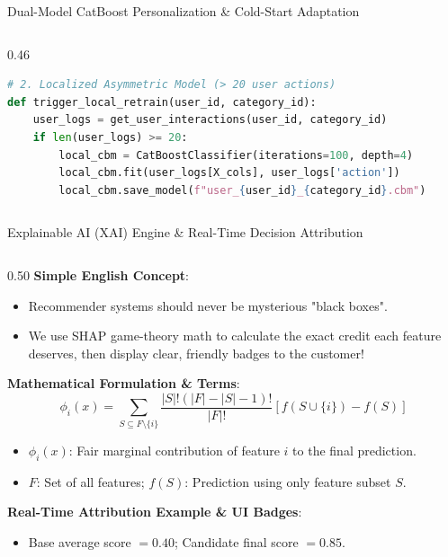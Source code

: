 \documentclass[10pt]{beamer}
\begin{document}
\begin{frame}[fragile]{Dual-Model CatBoost Personalization \& Cold-Start Adaptation}
\begin{columns}[T]
\begin{column}{0.46\textwidth}
\begin{lstlisting}[language=Python]
# 2. Localized Asymmetric Model (> 20 user actions)
def trigger_local_retrain(user_id, category_id):
    user_logs = get_user_interactions(user_id, category_id)
    if len(user_logs) >= 20:
        local_cbm = CatBoostClassifier(iterations=100, depth=4)
        local_cbm.fit(user_logs[X_cols], user_logs['action'])
        local_cbm.save_model(f"user_{user_id}_{category_id}.cbm")
\end{lstlisting}
    \end{column}
\end{columns}
\end{frame}

\begin{frame}[fragile]{Explainable AI (XAI) Engine \& Real-Time Decision Attribution}
\begin{columns}[T]
    \begin{column}{0.50\textwidth}
        {\color{brandred}\textbf{Simple English Concept}}:
        \begin{itemize}\scriptsize
            \item Recommender systems should never be mysterious "black boxes".
            \item We use SHAP game-theory math to calculate the exact credit each feature deserves, then display clear, friendly badges to the customer!
        \end{itemize}
        {\color{brandorange}\textbf{Mathematical Formulation \& Terms}}:
        \begin{equation*}
            \phi_i(x) = \sum_{S \subseteq F \setminus \{i\}} \frac{|S|! (|F| - |S| - 1)!}{|F|!} \left[ f(S \cup \{i\}) - f(S) \right]
        \end{equation*}
        \begin{itemize}\scriptsize
            \item $\phi_i(x)$: Fair marginal contribution of feature $i$ to the final prediction.
            \item $F$: Set of all features; $f(S)$: Prediction using only feature subset $S$.
        \end{itemize}
        {\color{brandred}\textbf{Real-Time Attribution Example \& UI Badges}}:
        \begin{itemize}\scriptsize
            \item Base average score $= 0.40$; Candidate final score $= 0.85$.

\end{itemize}
\end{column}
\end{columns}
\end{frame}
\end{document}
